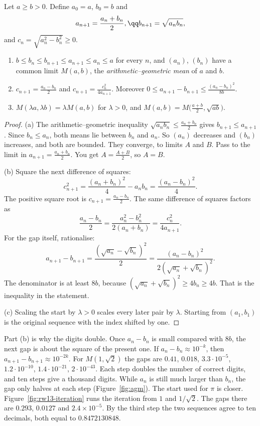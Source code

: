 Let $a\ge b>0$. Define $a_0=a$, $b_0=b$ and
\[
\begin{gathered}a_{n+1}=\frac{a_n+b_n}2,\qq b_{n+1}=\sqrt{a_nb_n},\end{gathered}
\]
and $c_n=\sqrt{a_n^2-b_n^2}\ge0$.

\begin{proposition}\label{prop:agm}
\begin{enumerate}[label=(\alph*)]
\item $b\le b_n\le b_{n+1}\le a_{n+1}\le a_n\le a$ for every $n$, and $(a_n)$, $(b_n)$ have a common limit $M(a,b)$, the \emph{arithmetic--geometric mean} of $a$ and $b$.
\item $c_{n+1}=\frac{a_n-b_n}2$ and $c_{n+1}=\frac{c_n^2}{4a_{n+1}}$. Moreover $0\le a_{n+1}-b_{n+1}\le\frac{(a_n-b_n)^2}{8b}$.
\item $M(\lambda a,\lambda b)=\lambda M(a,b)$ for $\lambda>0$, and $M(a,b)=M\bigl(\frac{a+b}2,\sqrt{ab}\bigr)$.
\end{enumerate}
\end{proposition}
\begin{proof}
(a) The arithmetic--geometric inequality $\sqrt{a_nb_n}\le\frac{a_n+b_n}2$ gives $b_{n+1}\le a_{n+1}$. Since $b_n\le a_n$, both means lie between $b_n$ and $a_n$. So $(a_n)$ decreases and $(b_n)$ increases, and both are bounded. They converge, to limits $A$ and $B$. Pass to the limit in $a_{n+1}=\frac{a_n+b_n}2$. You get $A=\frac{A+B}2$, so $A=B$.

(b) Square the next difference of squares:
\[
c_{n+1}^2=\frac{(a_n+b_n)^2}4-a_nb_n=\frac{(a_n-b_n)^2}4.
\]
The positive square root is $c_{n+1}=\frac{a_n-b_n}2$. The same difference of squares factors as
\[
\frac{a_n-b_n}2=\frac{a_n^2-b_n^2}{2(a_n+b_n)}=\frac{c_n^2}{4a_{n+1}}.
\]
For the gap itself, rationalise:
\[
a_{n+1}-b_{n+1}=\frac{(\sqrt{a_n}-\sqrt{b_n})^2}2=\frac{(a_n-b_n)^2}{2(\sqrt{a_n}+\sqrt{b_n})^2}.
\]
The denominator is at least $8b$, because $(\sqrt{a_n}+\sqrt{b_n})^2\ge4b_n\ge4b$. That is the inequality in the statement.

(c) Scaling the start by $\lambda>0$ scales every later pair by $\lambda$. Starting from $(a_1,b_1)$ is the original sequence with the index shifted by one.
\end{proof}

Part (b) is why the digits double. Once $a_n-b_n$ is small compared with $8b$, the next gap is about the square of the present one. If $a_n-b_n\approx10^{-k}$, then $a_{n+1}-b_{n+1}\approx10^{-2k}$. For $M(1,\sqrt2)$ the gaps are $0.41$, $0.018$, $3.3\cdot10^{-5}$, $1.2\cdot10^{-10}$, $1.4\cdot10^{-21}$, $2\cdot10^{-43}$. Each step doubles the number of correct digits, and ten steps give a thousand digits. While $a_n$ is still much larger than $b_n$, the gap only halves at each step (Figure~\ref{fig:agm}). The start used for $\pi$ is closer. Figure~\ref{fig:rw13-iteration} runs the iteration from $1$ and $1/\sqrt2$. The gaps there are $0.293$, $0.0127$ and $2.4\times10^{-5}$. By the third step the two sequences agree to ten decimals, both equal to $0.8472130848$.

